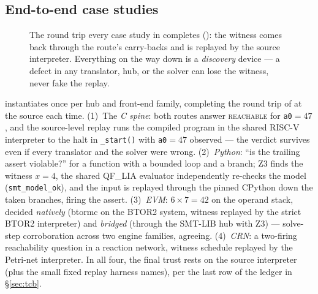 \subsection{End-to-end case studies}
\label{sec:eval-cases}

{\setlength{\tabcolsep}{4.5pt}%
}

\begin{figure}
\centering
{}
\caption{The round trip every case study in  completes
(): the witness comes back through the route's
carry-backs and is replayed by the source interpreter. Everything on
the way down is a \emph{discovery} device --- a defect in any
translator, hub, or the solver can lose the witness, never fake the
replay.}
\label{fig:replay}
\end{figure}

 instantiates  once per hub and
front-end family, completing the round trip of  at
the source each time. (1)~The \emph{C spine}: both routes answer
\textsc{reachable} for \texttt{a0}${=}47$, and the source-level replay
runs the compiled program in the shared RISC-V interpreter to the halt
in \texttt{\_start()} with \texttt{a0}${=}47$ observed --- the verdict
survives even if every translator and the solver were wrong.
(2)~\emph{Python}: ``is the trailing assert violable?'' for a function
with a bounded loop and a branch; Z3 finds the witness $x{=}4$, the
shared \textsc{QF\_LIA} evaluator independently re-checks the model
(\texttt{smt\_model\_ok}), and the input is replayed through the pinned
CPython down the taken branches, firing the assert. (3)~\emph{EVM}:
$6\times7{=}42$ on the operand stack, decided \emph{natively} (btormc
on the BTOR2 system, witness replayed by the strict BTOR2 interpreter)
and \emph{bridged} (through the SMT-LIB hub with Z3) --- solve-step
corroboration across two engine families, agreeing. (4)~\emph{CRN}: a
two-firing reachability question in a reaction network, witness
schedule replayed by the Petri-net interpreter. In all four, the final
trust rests on the source interpreter (plus the small fixed replay
harness  names), per the last row of the
ledger in \S\ref{sec:tcb}.

